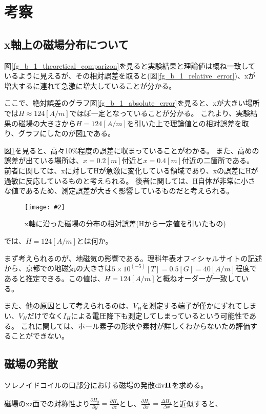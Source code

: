 \documentclass[uplatex,11pt]{jsarticle}
\newcommand{\cir}[3]{ %
    \begin{figure}
        \begin{center}
            \texttt{[image: \#2]}
            \caption{#3}
            \label{fg_#1}
         \end{center}
    \end{figure}
}
\newcommand{\fr}[1]{図\ref{fg_#1}}
\begin{document}
\section{考察}

\subsection{x軸上の磁場分布について}

\fr{b_1_theoretical_comparizon}を見ると実験結果と理論値は概ね一致しているように見えるが、その相対誤差を取ると(\fr{b_1_relative_error})、xが増大するに連れて急激に増大していることが分かる。

ここで、絶対誤差のグラフ\fr{b_1_absolute_error}を見ると、xが大きい場所では$H \approx 124[A/m]$でほぼ一定となっていることが分かる。
これより、実験結果の磁場の大きさから$ H = 124[A/m] $を引いた上で理論値との相対誤差を取り、グラフにしたのが\fr{b_1_relative_error_with_offset}である。

\fr{b_1_relative_error_with_offset}を見ると、高々10\%程度の誤差に収まっていることがわかる。
また、高めの誤差が出ている場所は、$x = 0.2[m]$付近と$x = 0.4[m]$付近の二箇所である。
前者に関しては、xに対してHが急激に変化している領域であり、xの誤差にHが過敏に反応しているものと考えられる。
後者に関しては、H自体が非常に小さな値であるため、測定誤差が大きく影響しているものだと考えられる。

\cir{b_1_relative_error_with_offset}{./graph/jikken_b_1_relative_error_with_offset.png}{ x軸に沿った磁場の分布の相対誤差(Hから一定値を引いたもの) }

では、$ H = 124[A/m] $とは何か。

まず考えられるのが、地磁気の影響である。理科年表オフィシャルサイトの記述から、京都での地磁気の大きさは$5 \times 10^(-5) [T] = 0.5 [G] = 40 [A/m]$程度であると推定できる。この値は、$H = 124[A/m]$と概ねオーダーが一致している。

また、他の原因として考えられるのは、$V_H$を測定する端子が僅かにずれてしまい、$V_H$だけでなく$I_H$による電圧降下も測定してしまっているという可能性である。
これに関しては、ホール素子の形状や素材が詳しくわからないため評価することができない。

\subsection{磁場の発散}

ソレノイドコイルの口部分における磁場の発散${\rm div} {\bf H}$を求める。

磁場のxz面での対称性より$\frac{\partial H_y}{\partial y} = \frac{\partial H_z}{\partial z}$とし、$\frac{\partial H_x}{\partial x} = \frac{\Delta H_x}{\Delta x}$と近似すると、
\end{document}
